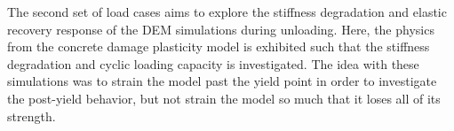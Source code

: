 The second set of load cases aims to explore the stiffness degradation and elastic recovery response of the DEM simulations during unloading. Here, the physics from the concrete damage plasticity model is exhibited such that the stiffness degradation and cyclic loading capacity is investigated. The idea with these simulations was to strain the model past the yield point in order to investigate the post-yield behavior,
but not strain the model so much that it loses all of its strength.


